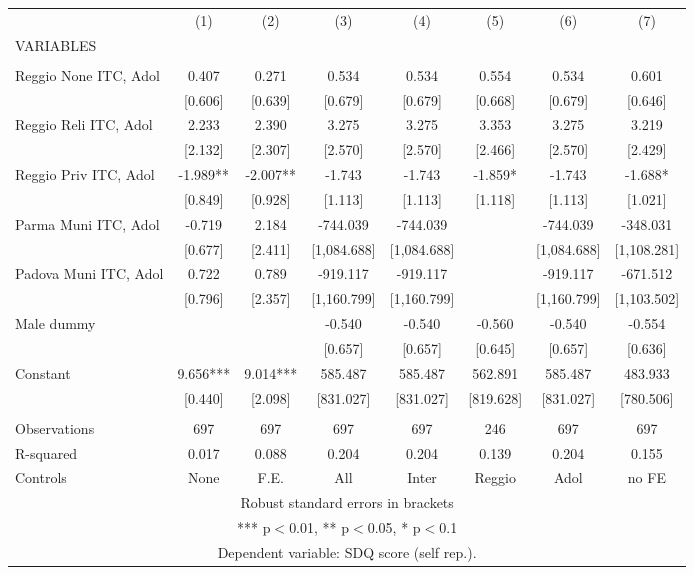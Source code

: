 \begin{tabular}{lccccccc} \hline
 & (1) & (2) & (3) & (4) & (5) & (6) & (7) \\
VARIABLES &  &  &  &  &  &  &  \\ \hline
 &  &  &  &  &  &  &  \\
Reggio None ITC, Adol & 0.407 & 0.271 & 0.534 & 0.534 & 0.554 & 0.534 & 0.601 \\
 & [0.606] & [0.639] & [0.679] & [0.679] & [0.668] & [0.679] & [0.646] \\
Reggio Reli ITC, Adol & 2.233 & 2.390 & 3.275 & 3.275 & 3.353 & 3.275 & 3.219 \\
 & [2.132] & [2.307] & [2.570] & [2.570] & [2.466] & [2.570] & [2.429] \\
Reggio Priv ITC, Adol & -1.989** & -2.007** & -1.743 & -1.743 & -1.859* & -1.743 & -1.688* \\
 & [0.849] & [0.928] & [1.113] & [1.113] & [1.118] & [1.113] & [1.021] \\
Parma Muni ITC, Adol & -0.719 & 2.184 & -744.039 & -744.039 &  & -744.039 & -348.031 \\
 & [0.677] & [2.411] & [1,084.688] & [1,084.688] &  & [1,084.688] & [1,108.281] \\
Padova Muni ITC, Adol & 0.722 & 0.789 & -919.117 & -919.117 &  & -919.117 & -671.512 \\
 & [0.796] & [2.357] & [1,160.799] & [1,160.799] &  & [1,160.799] & [1,103.502] \\
Male dummy &  &  & -0.540 & -0.540 & -0.560 & -0.540 & -0.554 \\
 &  &  & [0.657] & [0.657] & [0.645] & [0.657] & [0.636] \\
Constant & 9.656*** & 9.014*** & 585.487 & 585.487 & 562.891 & 585.487 & 483.933 \\
 & [0.440] & [2.098] & [831.027] & [831.027] & [819.628] & [831.027] & [780.506] \\
 &  &  &  &  &  &  &  \\
Observations & 697 & 697 & 697 & 697 & 246 & 697 & 697 \\
R-squared & 0.017 & 0.088 & 0.204 & 0.204 & 0.139 & 0.204 & 0.155 \\
 Controls & None & F.E. & All & Inter & Reggio & Adol & no FE \\ \hline
\multicolumn{8}{c}{ Robust standard errors in brackets} \\
\multicolumn{8}{c}{ *** p$<$0.01, ** p$<$0.05, * p$<$0.1} \\
\multicolumn{8}{c}{ Dependent variable: SDQ score (self rep.).} \\
\end{tabular}
